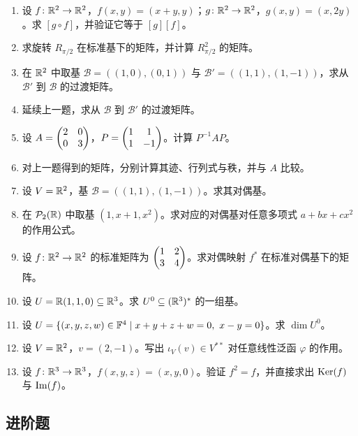 \begin{enumerate}[label=\textbf{\arabic*.}, leftmargin=3.5em]
  \item {\basic} 设 $f\colon \mathbb{R}^2\to\mathbb{R}^2$，$f(x,y)=(x+y,y)$；$g\colon \mathbb{R}^2\to\mathbb{R}^2$，$g(x,y)=(x,2y)$。求 $[g\circ f]$，并验证它等于 $[g][f]$。
  \item {\basic} 求旋转 $R_{\pi/2}$ 在标准基下的矩阵，并计算 $R_{\pi/2}^2$ 的矩阵。
  \item {\basic} 在 $\mathbb{R}^2$ 中取基 $\mathcal B=((1,0),(0,1))$ 与 $\mathcal B'=((1,1),(1,-1))$，求从 $\mathcal B'$ 到 $\mathcal B$ 的过渡矩阵。
  \item {\basic} 延续上一题，求从 $\mathcal B$ 到 $\mathcal B'$ 的过渡矩阵。
  \item {\basic} 设 $A=\begin{pmatrix} 2 & 0\\ 0 & 3 \end{pmatrix}$，$P=\begin{pmatrix} 1 & 1\\ 1 & -1 \end{pmatrix}$。计算 $P^{-1}AP$。
  \item {\basic} 对上一题得到的矩阵，分别计算其迹、行列式与秩，并与 $A$ 比较。
  \item {\basic} 设 $V=\mathbb{R}^2$，基 $\mathcal B=((1,1),(1,-1))$。求其对偶基。
  \item {\basic} 在 $\mathcal P_2(\mathbb{R})$ 中取基 $(1,x+1,x^2)$。求对应的对偶基对任意多项式 $a+bx+cx^2$ 的作用公式。
  \item {\basic} 设 $f\colon \mathbb{R}^2\to\mathbb{R}^2$ 的标准矩阵为 $\begin{pmatrix} 1 & 2\\ 3 & 4 \end{pmatrix}$。求对偶映射 $f^*$ 在标准对偶基下的矩阵。
  \item {\basic} 设 $U=\mathbb{R}(1,1,0)\subseteq \mathbb{R}^3$。求 $U^0\subseteq (\mathbb{R}^3)^*$ 的一组基。
  \item {\basic} 设 $U=\{(x,y,z,w)\in\mathbb{F}^4\mid x+y+z+w=0,\ x-y=0\}$。求 $\dim U^0$。
  \item {\basic} 设 $V=\mathbb{R}^2$，$v=(2,-1)$。写出 $\iota_V(v)\in V^{**}$ 对任意线性泛函 $\varphi$ 的作用。
  \item {\basic} 设 $f\colon \mathbb{R}^3\to\mathbb{R}^3$，$f(x,y,z)=(x,y,0)$。验证 $f^2=f$，并直接求出 $\mathrm{Ker}(f)$ 与 $\mathrm{Im}(f)$。
\end{enumerate}

\subsection*{进阶题}

